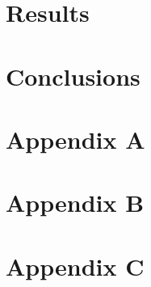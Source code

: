 \documentclass[oneside,openright,titlepage,numbers=noenddot,headinclude,footinclude=true,cleardoublepage=empty,listof=totoc,paper=a4,fontsize=11pt,american,BCOR=5mm]{scrreprt}
\begin{document}
  \chapter{Results}\label{c:Results}
  
  \newpage
  
  \chapter{Conclusions}\label{c:Conclusions}
  
  \newpage
  
  \chapter{Appendix A}\label{c:AppendixA}
  
  \newpage

  \chapter{Appendix B}\label{c:AppendixB}
  
  \newpage

  \chapter{Appendix C}\label{c:AppendixC}
  
  \newpage

  
  \cleardoublepage
  \appendix

  
  \singlespacing
  
  \cleardoublepage

  \pagestyle{empty}
  \onehalfspacing
  
\end{document}

